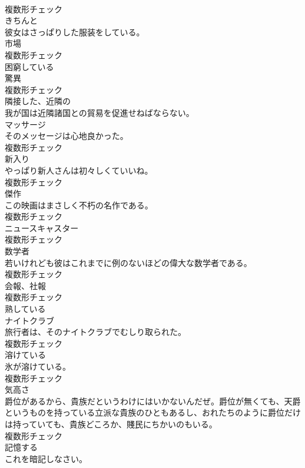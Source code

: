 \documentclass[8pt]{extreport}
\begin{document}
\begin{CJK}{UTF8}{min}
\\	複数形チェック
\\	[副詞]	きちんと	
\\	彼女はさっぱりした服装をしている。	
\\	[名詞]	市場	
\\	複数形チェック
\\	[形容詞]	困窮している	
\\	[名詞]	驚異	
\\	複数形チェック
\\	[形容詞]	隣接した、近隣の	
\\	我が国は近隣諸国との貿易を促進せねばならない。	
\\	[名詞]	マッサージ	
\\	そのメッセージは心地良かった。	
\\	複数形チェック
\\	[名詞]	新入り	
\\	やっぱり新人さんは初々しくていいね。	
\\	複数形チェック
\\	[名詞]	傑作	
\\	この映画はまさしく不朽の名作である。	
\\	複数形チェック
\\	[名詞]	ニュースキャスター	
\\	複数形チェック
\\	[名詞]	数学者	
\\	若いけれども彼はこれまでに例のないほどの偉大な数学者である。	
\\	複数形チェック
\\	[名詞]	会報、社報	
\\	複数形チェック
\\	[形容詞]	熟している	
\\	[名詞]	ナイトクラブ	
\\	旅行者は、そのナイトクラブでむしり取られた。	
\\	複数形チェック
\\	[名詞]	溶けている	
\\	氷が溶けている。	
\\	複数形チェック
\\	[名詞]	気高さ	
\\	爵位があるから、貴族だというわけにはいかないんだぜ。爵位が無くても、天爵というものを持っている立派な貴族のひともあるし、おれたちのように爵位だけは持っていても、貴族どころか、賤民にちかいのもいる。	
\\	複数形チェック
\\	[動詞]	記憶する	
\\	これを暗記しなさい。	

\end{CJK}
\end{document}
